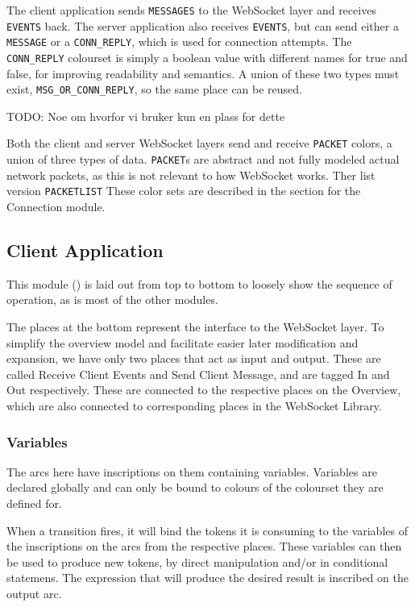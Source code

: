 	The client application sends \lstinline:MESSAGES: to the WebSocket layer and
	receives \lstinline:EVENTS: back. The server application also receives
	\lstinline:EVENTS:, but can send either a \lstinline:MESSAGE: or a
	\lstinline:CONN_REPLY:, which is used for connection attempts. The
	\lstinline:CONN_REPLY: colourset is simply a boolean value with different
	names for true and false, for improving readability and semantics. A union of
	these two types must exist, \lstinline:MSG_OR_CONN_REPLY:, so the same place
	can be reused.
	
	TODO: Noe om hvorfor vi bruker kun en plass for dette
	
	Both the client and server WebSocket layers send and receive
	\lstinline:PACKET: colors, a union of three types of data. \lstinline:PACKET:s
	are abstract and not fully modeled actual network packets, as this is not
	relevant to how WebSocket works. Ther list version \lstinline:PACKETLIST: These
	color sets are described in the section for the Connection module.

\subsection{Client Application}

	
	This module () is laid out from top to bottom to loosely show
	the sequence of operation, as is most of the other modules.
	
	The places at the bottom represent the interface to the WebSocket layer. To
	simplify the overview model and facilitate easier later modification
	and expansion, we have only two places that act as input and output. These are
	called Receive Client Events and Send Client Message, and are tagged In and
	Out respectively. These are connected to the respective places on the
	Overview, which are also connected to corresponding places in the WebSocket
	Library.
	
	
	\subsubsection{Variables}
	
		The arcs here have inscriptions on them containing variables. Variables are
		declared globally and can only be bound to colours of the colourset they are
		defined for. 
		
		When a transition fires, it will bind the tokens it is consuming to the
		variables of the inscriptions on the arcs from the respective places. These
		variables can then be used to produce new tokens, by direct manipulation
		and/or in conditional statemens. The expression that will produce the desired
		result is inscribed on the output arc. 
		
